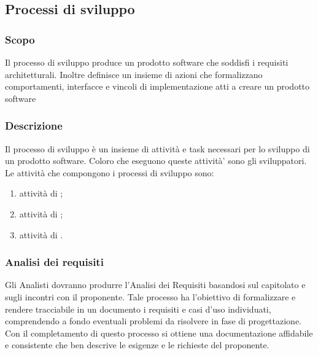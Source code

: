 \documentclass[12pt,a4paper]{article}
\begin{document}

\subsection{Processi di sviluppo}

\subsubsection{Scopo}
Il processo di sviluppo produce un prodotto software che soddisfi i requisiti architetturali. Inoltre definisce un insieme di azioni che formalizzano comportamenti, interfacce e vincoli di implementazione atti a creare un prodotto software

\subsubsection{Descrizione}
Il processo di sviluppo è un insieme di attività e task necessari per lo sviluppo di un prodotto software. Coloro che eseguono queste attività' sono gli sviluppatori. Le attività che compongono i processi di sviluppo sono:
\begin{enumerate}
	\item attività di \FA;
	\item attività di \FPA;
	\item attività di \FPDC.
\end{enumerate}

\subsubsection{Analisi dei requisiti}
Gli Analisti dovranno produrre l'Analisi dei Requisiti basandosi sul capitolato e sugli incontri con il proponente. Tale processo ha l'obiettivo di formalizzare e rendere tracciabile in un documento i requisiti e casi d'uso individuati, comprendendo a fondo eventuali problemi da risolvere in fase di progettazione. Con il completamento di questo processo si ottiene una documentazione affidabile e consistente che ben descrive le esigenze e le richieste del proponente.
\end{document}
